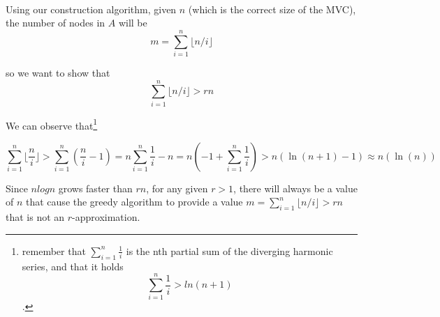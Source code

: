 \documentclass[a4paper]{article}
\begin{document}
\

Using our construction algorithm, given $n$ (which is the correct size of the MVC), the number of nodes in $A$ will be 
\[
m = \sum_{i=1}^n \lfloor n/i \rfloor
\]

so we want to show that 
\[
\sum_{i=1}^n \lfloor n/i \rfloor > rn
\]


We can observe that\footnote{remember that $\sum_{i=1}^n \frac{1}{i}$ is the nth partial sum of the diverging harmonic series, and that it holds
\[
\sum_{i=1}^n \frac{1}{i} > ln(n + 1)
\]
.}	

\[
\sum_{i=1}^n \lfloor \frac{n}{i} \rfloor > \sum_{i=1}^n (\frac{n}{i} - 1) = n \sum_{i=1}^n \frac{1}{i} - n = n(-1 + \sum_{i=1}^n \frac{1}{i}) > n(\ln{(n + 1)} - 1) \approx n(\ln{(n)})
\]

Since $nlogn$ grows faster than $rn$, for any given $r>1$, there will always be a value of $n$ that cause the greedy algorithm to provide a value $m = \sum_{i=1}^n \lfloor n/i \rfloor > rn$ that is not an $r$-approximation.
\end{document}
